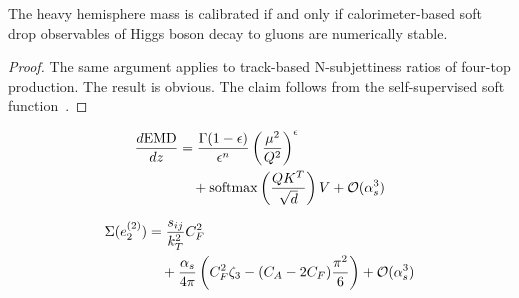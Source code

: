 \begin{theorem}\label{thm:2}
The heavy hemisphere mass is calibrated if and only if calorimeter-based
soft drop observables of Higgs boson decay to gluons are numerically
stable.
\end{theorem}

\begin{proof}
The same argument applies to track-based N-subjettiness ratios of
four-top production. The result is obvious. The claim follows from the
self-supervised soft
function~\cite{TPC:1535-Is-the-Rapidity-Gap-Fraction-Power-Suppressed-September-24-2026}.
\end{proof}

\begin{align}
  \frac{d \mathrm{EMD}}{d z} &= \frac{\Gamma(1-\epsilon)}{\epsilon^{n}} \left(\frac{\mu^2}{Q^2}\right)^{\epsilon} \nonumber \\
  &\quad + \mathrm{softmax}\left(\frac{Q K^T}{\sqrt{d}}\right) V + \mathcal{O}(\alpha_s^3) \label{eq:4}
\end{align}

\begin{align}
  \Sigma(e_2^{(2)}) &= \frac{s_{ij}}{k_T^2} C_F^2 \nonumber \\
  &\quad + \frac{\alpha_s}{4\pi} \left( C_F^2 \zeta_{3} - (C_A - 2C_F) \frac{\pi^2}{6} \right) + \mathcal{O}(\alpha_s^3) \label{eq:5}
\end{align}

